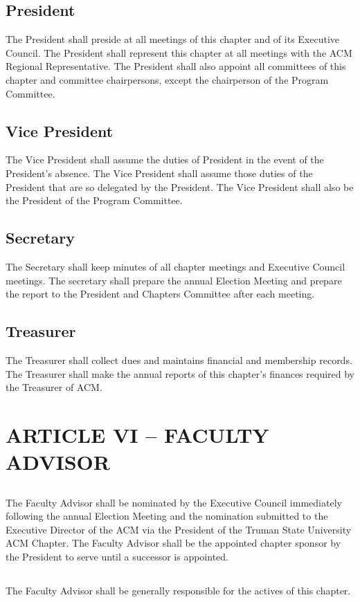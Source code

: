 \documentclass[12pt]{article}
\begin{document}
\subsection{President}	The President shall preside at all meetings of this chapter and of its Executive Council. The President shall represent this chapter at all meetings with the ACM Regional Representative. The President shall also appoint all committees of this chapter and committee chairpersons, except the chairperson of the Program Committee.
\subsection{Vice President}	The Vice President shall assume the duties of President in the event of the President's absence. The Vice President shall assume those duties of the President that are so delegated by the President. The Vice President shall also be the President of the Program Committee.
\subsection{Secretary}	The Secretary shall keep minutes of all chapter meetings and Executive Council meetings. The secretary shall prepare the annual Election Meeting and prepare the report to the President and Chapters Committee after each meeting.
\subsection{Treasurer}	The Treasurer shall collect dues and maintains financial and membership records. The Treasurer shall make the annual reports of this chapter's finances required by the Treasurer of ACM.

\section{ARTICLE VI – FACULTY ADVISOR}
\subsection{}	The Faculty Advisor shall be nominated by the Executive Council immediately following the annual Election Meeting and the nomination submitted to the Executive Director of the ACM via the President of the Truman State University ACM Chapter. The Faculty Advisor shall be the appointed chapter sponsor by the President to serve until a successor is appointed.
\subsection{}	The Faculty Advisor shall be generally responsible for the actives of this chapter.
\end{document}
